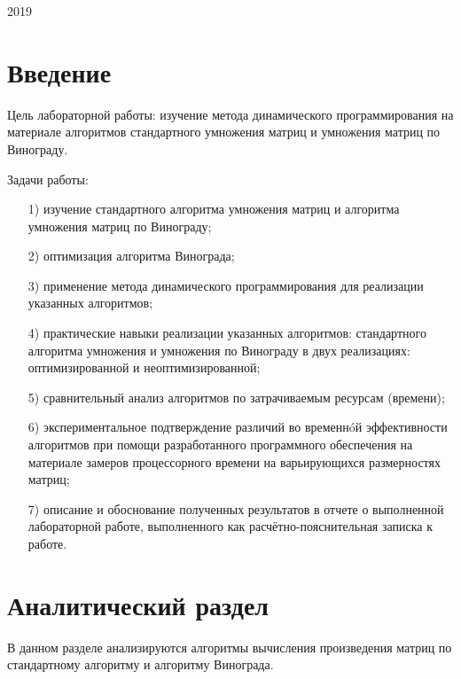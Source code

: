 \documentclass[a4paper,12pt]{article}
\begin{document}
\vspace*{40mm}
\begin{center}
2019    
\end{center}
\thispagestyle{empty}
\pagebreak


\tableofcontents
\pagebreak


\section*{Введение}

Цель лабораторной работы: изучение метода динамического программирования на материале алгоритмов стандартного умножения матриц и умножения матриц по Винограду.

Задачи работы:

	
\begin{enumerate} 
	
	\item[1)] изучение стандартного алгоритма умножения матриц и алгоритма умножения матриц по Винограду;
	\item[2)] оптимизация алгоритма Винограда;
	\item[3)] применение метода динамического программирования для  
	реализации указанных
	алгоритмов;
	\item[4)] практические навыки реализации указанных алгоритмов: стандартного алгоритма умножения и умножения по Винограду в двух реализациях: оптимизированной и неоптимизированной;
	\item[5)] сравнительный анализ алгоритмов по затрачиваемым ресурсам (времени);
	\item[6)] экспериментальное подтверждение различий во временнóй эффективности
	алгоритмов при помощи разработанного программного обеспечения на материале замеров
	процессорного времени на варьирующихся размерностях матриц;
	\item[7)] описание и обоснование полученных результатов в отчете о выполненной
	лабораторной
	работе, выполненного как расчётно-пояснительная записка к работе. 
\end{enumerate} 
\pagebreak



\section{Аналитический раздел}
	
	В данном разделе анализируются алгоритмы вычисления произведения матриц по стандартному алгоритму и алгоритму Винограда. 
	
\end{document}
